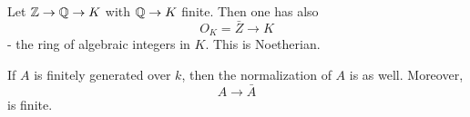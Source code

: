 \begin{example}
  Let $\mathbb Z \to \mathbb Q \to K$ with $\mathbb Q \to K$ finite.
  Then one has also
  \[ O_K = \bar Z \to K\]
  - the ring of algebraic integers in $K$. This is Noetherian.
\end{example}

\begin{theorem}[Nagata]
  If $A$ is finitely generated over $k$, then the normalization of $A$ is as well. Moreover,
  \[ A \to \bar A\]
  is finite.
\end{theorem}









